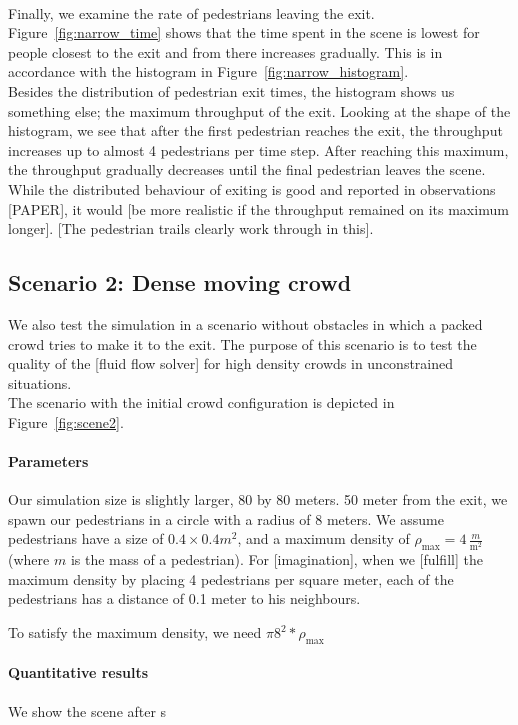 \documentclass{article}
\begin{document}
\ \\
Finally, we examine the rate of pedestrians leaving the exit. Figure~\ref{fig:narrow_time} shows that the time spent in the scene is lowest for people closest to the exit and from there increases gradually. This is in accordance with the histogram in Figure~\ref{fig:narrow_histogram}. \\
Besides the distribution of pedestrian exit times, the histogram shows us something else; the maximum throughput of the exit. Looking at the shape of the histogram, we see that after the first pedestrian reaches the exit, the throughput increases up to almost 4 pedestrians per time step.
After reaching this maximum, the throughput gradually decreases until the final pedestrian leaves the scene. 
While the distributed behaviour of exiting is good and reported in observations [PAPER], it would [be more realistic if the throughput remained on its maximum longer]. [The pedestrian trails clearly work through in this].

\subsection{Scenario 2: Dense moving crowd}
We also test the simulation in a scenario without obstacles in which a packed crowd tries to make it to the exit. The purpose of this scenario is to test the quality of the [fluid flow solver] for high density crowds in unconstrained situations.\\
The scenario with the initial crowd configuration is depicted in Figure~\ref{fig:scene2}.
\paragraph{Parameters}
Our simulation size is slightly larger, 80 by 80 meters. 50 meter from the exit, we spawn our pedestrians in a circle with a radius of 8 meters. We assume pedestrians have a size of $0.4\times 0.4m^2$, and a maximum density of $\rho_{\max} = 4\,\frac{m}{\textrm{m}^2}$ (where $m$ is the mass of a pedestrian). For [imagination], when we [fulfill] the maximum density by placing 4 pedestrians per square meter, each of the pedestrians has a distance of 0.1 meter to his neighbours.

To satisfy the maximum density, we need $\pi 8^2 * \rho_{\max}$
\paragraph{Quantitative results}
We show the scene after s
\end{document}
